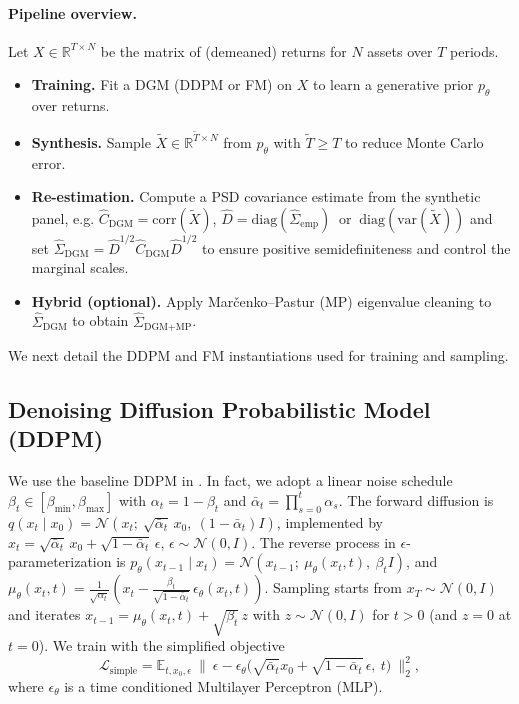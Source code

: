 \documentclass{article}
\begin{document}
\paragraph{Pipeline overview.}\label{dgmdenoising_pipeline} Let $X\in\mathbb{R}^{T\times N}$ be the matrix of (demeaned) returns for $N$ assets over $T$ periods.
\begin{itemize}
    \item \textbf{Training.} Fit a DGM (DDPM or FM) on $X$ to learn a generative prior $p_\theta$ over returns.
    \item \textbf{Synthesis.} Sample $\widetilde{X}\in\mathbb{R}^{\widetilde{T}\times N}$ from $p_\theta$ with $\widetilde{T}\ge T$ to reduce Monte Carlo error.
    \item \textbf{Re-estimation.} Compute a PSD covariance estimate from the synthetic panel, e.g. $\widehat{C}_{\text{DGM}}=\mathrm{corr}(\widetilde{X})$, 
      $\widehat{D}=\mathrm{diag}(\widehat{\Sigma}_{\text{emp}})\ \text{ or }\ \mathrm{diag}(\mathrm{var}(\widetilde{X}))$  
    and set $\widehat{\Sigma}_{\text{DGM}}=\widehat{D}^{1/2}\widehat{C}_{\text{DGM}}\widehat{D}^{1/2}$ to ensure positive semidefiniteness and control the marginal scales.
    \item \textbf{Hybrid (optional).} Apply Mar\v{c}enko--Pastur (MP) eigenvalue cleaning to $\widehat{\Sigma}_{\text{DGM}}$ to obtain $\widehat{\Sigma}_{\text{DGM+MP}}$.
\end{itemize}
We next detail the DDPM and FM instantiations used for training and sampling.
\subsection{Denoising Diffusion Probabilistic Model (DDPM)}
We use the baseline DDPM in  \cite{ho2020denoising}. In fact, we adopt a linear noise schedule $\beta_t\in[\beta_{\min},\beta_{\max}]$ with $\alpha_t=1-\beta_t$ and $\bar{\alpha}_t=\prod_{s=0}^t \alpha_s$. The forward diffusion is $q(x_t\mid x_0)=\mathcal{N}\!\left(x_t;\ \sqrt{\bar{\alpha}_t}\,x_0,\ (1-\bar{\alpha}_t)I\right)$, 
implemented by $x_t=\sqrt{\bar{\alpha}_t}\,x_0+\sqrt{1-\bar{\alpha}_t}\,\epsilon$, $\epsilon\sim\mathcal{N}(0,I)$. The reverse process in $\epsilon$-parameterization is
$p_\theta(x_{t-1}\mid x_t)=\mathcal{N}\!\left(x_{t-1};\ \mu_\theta(x_t,t),\ \beta_t I\right)$, and
$\mu_\theta(x_t,t)=\frac{1}{\sqrt{\alpha_t}}\!\left(x_t-\frac{\beta_t}{\sqrt{1-\bar{\alpha}_t}}\,\epsilon_\theta(x_t,t)\right)$.
Sampling starts from $x_T\sim\mathcal{N}(0,I)$ and iterates
$x_{t-1}=\mu_\theta(x_t,t)+\sqrt{\beta_t}\,z$ with $z\sim\mathcal{N}(0,I)$ for $t>0$ (and $z=0$ at $t=0$).
We train with the simplified objective
\[
\mathcal{L}_{\mathrm{simple}}
=\mathbb{E}_{t,x_0,\epsilon}\ \bigl\|\ \epsilon-\epsilon_\theta\!\bigl(\sqrt{\bar{\alpha}_t}x_0+\sqrt{1-\bar{\alpha}_t}\,\epsilon,\ t\bigr)\ \bigr\|_2^2,
\]
where $\epsilon_\theta$ is a time conditioned Multilayer Perceptron (MLP).
\end{document}
